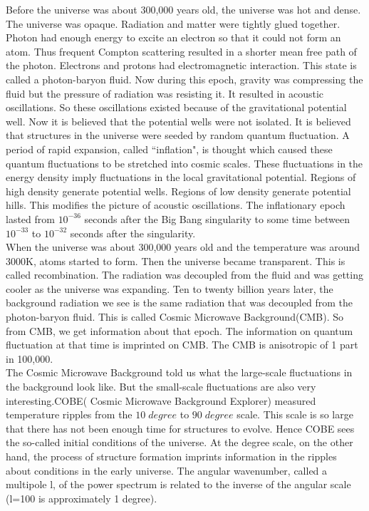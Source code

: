 \documentclass[12pt]{report}
\begin{document}
 
Before the universe was about 300,000 years old, the universe was hot and dense. The universe was opaque. Radiation and matter were tightly glued together.  Photon had enough energy to excite an electron so that it could not form an atom. Thus frequent Compton scattering resulted in a shorter mean free path of the photon. Electrons and protons had electromagnetic interaction.  This state is called a photon-baryon fluid. Now during this epoch, gravity was compressing the fluid but the pressure of radiation was resisting it. It resulted in acoustic oscillations. So these oscillations existed because of the gravitational potential well. Now it is believed that the potential wells were not isolated. It is believed that structures in the universe were seeded by random quantum fluctuation. A period of rapid expansion, called ``inflation", is thought which caused these quantum fluctuations to be stretched into cosmic scales. These fluctuations in the energy density imply fluctuations in the local gravitational potential.  Regions of high density generate potential wells. Regions of low density generate potential hills. This modifies the picture of acoustic oscillations. The inflationary epoch lasted from $10^{-36}$ seconds after the Big Bang singularity to some time between $10^{-33}$ to $10^{-32}$ seconds after the singularity. \cite{whu} \\

When the universe was about 300,000 years old and the temperature was around 3000K, atoms started to form. Then the universe became transparent. This is called recombination. The radiation was decoupled from the fluid and was getting cooler as the universe was expanding. Ten to twenty billion years later, the background radiation we see is the same radiation that was decoupled from the photon-baryon fluid. This is called Cosmic Microwave Background(CMB). So from CMB, we get information about that epoch. The information on quantum fluctuation at that time is imprinted on CMB. The CMB is anisotropic of 1 part in 100,000. \cite{whu} \\

The Cosmic Microwave Background told us what the large-scale fluctuations in the background look like. But the small-scale fluctuations are also very interesting.COBE( Cosmic Microwave Background Explorer) measured temperature ripples from the $10\; degree$ to $90\; degree$ scale. This scale is so large that there has not been enough time for structures to evolve.  Hence COBE sees the so-called initial conditions of the universe. At the degree scale, on the other hand, the process of structure formation imprints information in the ripples about conditions in the early universe. The angular wavenumber, called a multipole l, of the power spectrum is related to the inverse of the angular scale (l=100 is approximately 1 degree).\\
\end{document}
